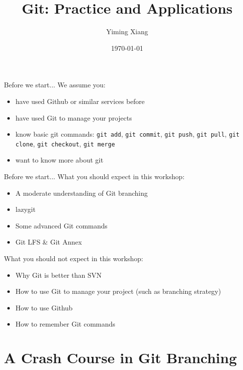 \documentclass[aspectratio=169]{beamer}
\title{Git: Practice and Applications}
\author{Yiming Xiang}
\institute{UM-SJTU Joint Institute}
\date{\today}
\begin{document}
\frame{\titlepage}

\begin{frame}{Before we start...}
    We assume you:
    \pause
    \begin{itemize}[<+->]
        \item have used Github or similar services before
        \item have used Git to manage your projects
        \item know basic git commands: \texttt{git add}, \texttt{git commit}, \texttt{git push}, \texttt{git pull}, \texttt{git clone}, \texttt{git checkout}, \texttt{git merge}
        \item want to know more about git
    \end{itemize}
\end{frame}

\begin{frame}{Before we start...}
    What you should expect in this workshop:
    \begin{itemize}
        \item A moderate understanding of Git branching
        \item lazygit
        \item Some advanced Git commands
        \item Git LFS \& Git Annex
    \end{itemize}

    \pause

    What you should not expect in this workshop:
    \begin{itemize}
        \item Why Git is better than SVN
        \item How to use Git to manage your project (such as branching strategy)
        \item How to use Github
        \item How to remember Git commands
    \end{itemize}
\end{frame}

\section{A Crash Course in Git Branching}
\end{document}
